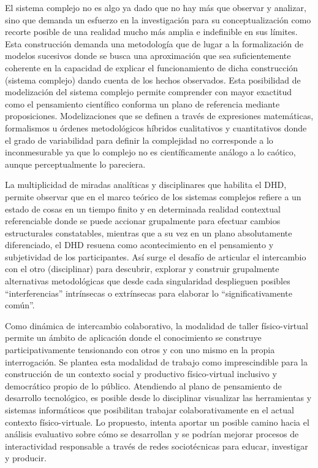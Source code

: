 El sistema complejo no es algo ya dado que no hay más que
observar y analizar, sino que demanda un esfuerzo en la investigación
para su conceptualización como recorte posible de una realidad mucho
más amplia e indefinible en sus límites. Esta construcción demanda una metodología que de lugar a la formalización de
modelos  sucesivos  donde   se  busca   una   aproximación  que   sea
suficientemente coherente en la capacidad de explicar el funcionamiento
de dicha construcción (sistema complejo) dando cuenta de los hechos
observados. Esta posibilidad de modelización del sistema complejo permite
comprender con mayor exactitud como el pensamiento científico conforma
un plano de referencia mediante proposiciones. Modelizaciones que se
definen a través de expresiones matemáticas, formalismos u órdenes
metodológicos híbridos cualitativos y cuantitativos donde el grado de
variabilidad  para definir la  complejidad  no  corresponde   a   lo
inconmesurable ya que lo complejo no es científicamente análogo a lo
caótico, aunque perceptualmente lo pareciera.

La multiplicidad de miradas analíticas y disciplinares que habilita el
DHD, permite observar que en el marco teórico de los sistemas complejos
refiere a un estado de cosas en un tiempo finito y en determinada realidad
contextual referenciable donde se puede accionar grupalmente para
efectuar cambios estructurales constatables, mientras que a su vez en un
plano absolutamente diferenciado, el DHD resuena como acontecimiento
en el pensamiento y subjetividad de los participantes. Así surge el desafío
de articular el intercambio con el otro (disciplinar) para descubrir, explorar
y construir grupalmente alternativas metodológicas que desde cada
singularidad desplieguen posibles “interferencias” intrínsecas o extrínsecas
para elaborar lo “significativamente común”.

Como dinámica de intercambio colaborativo, la modalidad de taller
físico-virtual permite un ámbito de aplicación donde el conocimiento se
construye participativamente tensionando con otros y con uno mismo en la
propia interrogación. Se plantea esta modalidad de trabajo como
imprescindible para la construcción de un contexto social y productivo
físico-virtual inclusivo y democrático propio de lo público. Atendiendo al plano de pensamiento de desarrollo
tecnológico, es posible desde lo disciplinar visualizar las herramientas y sistemas informáticos que posibilitan trabajar colaborativamente en el actual contexto físico-virtuale. Lo propuesto, intenta aportar un posible camino
hacia el análisis evaluativo sobre cómo se desarrollan y se podrían mejorar
procesos de interactividad responsable a través de redes sociotécnicas para
educar, investigar y producir. 


